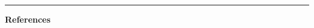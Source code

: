 \documentclass[a0,plainsections,30pt]{sciposter}\usepackage[]{graphicx}\usepackage[]{color}
\newcommand{\Expect}{\mathbb{E}}
\newcommand{\etazopt}{\eta_z^{*}}
\newcommand{\etathetaopt}{\eta_\theta^{*}}
\newcommand{\QExpect}
{\Expect_{q\left(\theta, z \vert \eta_\theta, \etazopt(\eta_\theta)\right)}}
\newcommand{\atzero}{\Big\rvert_{\eta_\theta = \etathetaopt, \epsilon = 0}}
\begin{document}
\begin{minipage}[t]{0.45\textwidth}
\begin{itemize}

\end{itemize}

\begin{center}
\noindent\rule{0.6\textwidth}{1pt}
\end{center}
{\bf References}
\renewcommand{\section}[2]{}%
\footnotesize{
  
  
}


\end{minipage}
\hfill \vrule \hfill
\end{document}

